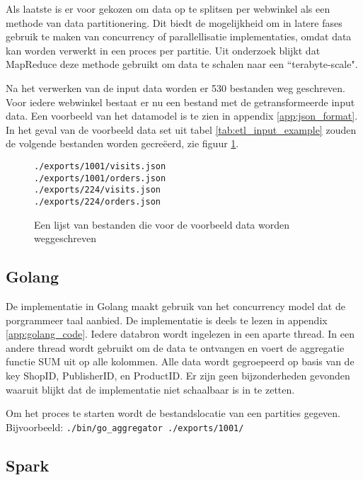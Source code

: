 Als laatste is er voor gekozen om data op te splitsen per webwinkel als een methode van data partitionering. Dit biedt de mogelijkheid om in latere fases gebruik te maken van concurrency of parallellisatie implementaties, omdat data kan worden verwerkt in een proces per partitie. Uit onderzoek blijkt dat MapReduce deze methode gebruikt om data te schalen naar een ``terabyte-scale".

Na het verwerken van de input data worden er 530 bestanden weg geschreven. Voor iedere webwinkel bestaat er nu een bestand met de getransformeerde input data. Een voorbeeld van het datamodel is te zien in appendix \ref{app:json_format}. In het geval van de voorbeeld data set uit tabel \ref{tab:etl_input_example} zouden de volgende bestanden worden gecreëerd, zie figuur \ref{fig:exports_files}. 

\begin{figure}[h]
    \caption{Een lijst van bestanden die voor de voorbeeld data worden weggeschreven}
    \label{fig:exports_files}
\begin{verbatim}
./exports/1001/visits.json
./exports/1001/orders.json
./exports/224/visits.json
./exports/224/orders.json
\end{verbatim}
\end{figure}


\clearpage

\subsection{Golang}


De implementatie in Golang maakt gebruik van het concurrency model dat de porgrammeer taal aanbied. De implementatie is deels te lezen in appendix \ref{app:golang_code}. Iedere databron  wordt ingelezen in een aparte thread. In een andere thread wordt gebruikt om de data te ontvangen en voert de aggregatie functie SUM uit op alle kolommen. Alle data wordt gegroepeerd op basis van de key ShopID, PublisherID, en ProductID. Er zijn geen bijzonderheden gevonden waaruit blijkt dat de implementatie niet schaalbaar is in te zetten.

Om het proces te starten wordt de bestandslocatie van een partities gegeven. Bijvoorbeeld: \newline\verb+./bin/go_aggregator ./exports/1001/+

\subsection{Spark}

